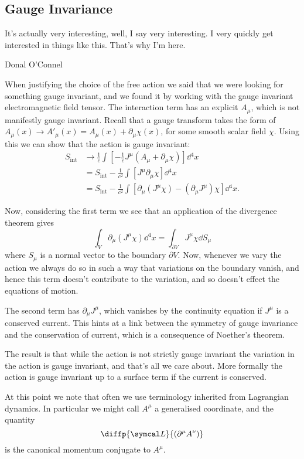 \subsection{Gauge Invariance}
\epigraph{It's actually very interesting, well, I say very interesting. I very quickly get interested in things like this. That's why I'm here.}{Donal O'Connel}
When justifying the choice of the free action we said that we were looking for something gauge invariant, and we found it by working with the gauge invariant electromagnetic field tensor.
The interaction term has an explicit \(A_\mu\), which is not manifestly gauge invariant.
Recall that a gauge transform takes the form of \(A_\mu(x) \to A'_\mu(x) = A_\mu(x) + \partial_\mu \chi(x)\), for some smooth scalar field \(\chi\).
Using this we can show that the action is gauge invariant:
\begin{align}
    S_{\text{int}} &\to \frac{1}{c}\int \left[ -\frac{1}{c} J^\mu(A_\mu + \partial_\mu \chi) \right] \dd{^4x}\\
    &= S_{\text{int}} - \frac{1}{c^2} \int \left[ J^\mu \partial_\mu \chi \right] \dd{^4x}\\
    &= S_{\text{int}} - \frac{1}{c^2} \int \left[  \partial_\mu(J^\mu \chi) - (\partial_\mu J^\mu)\chi \right] \dd{^4x}.
\end{align}

Now, considering the first term we see that an application of the divergence theorem gives
\begin{equation}
    \int_{V} \partial_\mu(J^\mu \chi) \dd{^4x} = \int_{\partial V} J^\mu \chi \dd{S_\mu}
\end{equation}
where \(S_\mu\) is a normal vector to the boundary \(\partial V\).
Now, whenever we vary the action we always do so in such a way that variations on the boundary vanish, and hence this term doesn't contribute to the variation, and so doesn't effect the equations of motion.

The second term has \(\partial_\mu J^\mu\), which vanishes by the continuity equation if \(J^\mu\) is a conserved current.
This hints at a link between the symmetry of gauge invariance and the conservation of current, which is a consequence of Noether's theorem.

The result is that while the action is not strictly gauge invariant the variation in the action is gauge invariant, and that's all we care about.
More formally the action is gauge invariant up to a surface term if the current is conserved.

At this point we note that often we use terminology inherited from Lagrangian dynamics.
In particular we might call \(A^\mu\) a generalised coordinate, and the quantity
\begin{equation}
    \diffp{\lagrangianDensity}{(\partial^\mu A^\nu)}
\end{equation}
is the canonical momentum conjugate to \(A^\mu\).

